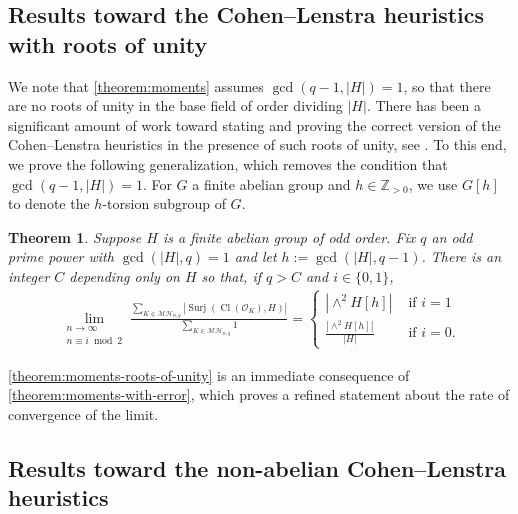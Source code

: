 \documentclass[12 pt]{amsart}
\theoremstyle{plain}
\newtheorem{theorem}[subsubsection]{Theorem}
\theoremstyle{definition}
\theoremstyle{remark}
\numberwithin{equation}{section}
\DeclareMathOperator\cl{Cl}
\DeclareMathOperator\surj{Surj}
\begin{document}
\subsection{Results toward the Cohen--Lenstra heuristics with roots of unity}
We note that \autoref{theorem:moments} assumes $\gcd(q-1,|H|) = 1$, so that
there are no roots of unity in the base field of order dividing $|H|$. 
There has been a significant amount of work toward stating and proving the correct version
of the Cohen--Lenstra heuristics in the presence of such roots of unity, see
\cite{
malle2008cohen,
Malle:distribution,
adamM:a-class-group-heuristic,
garton:random-matrices-the-cohen-lenstra-heuristics-and-roots-of-unity,
lipnowskiST:cohen-lenstra-roots-of-unity,sawinW:conjectures-for-distributions-containing-roots-of-unity}. To this
end, we prove the following generalization, which removes the condition that
$\gcd(q-1,|H|) = 1$.
For $G$ a finite abelian group and $h \in \mathbb Z_{>0}$, we use $G[h]$ to denote
the $h$-torsion subgroup of $G$.

\begin{theorem}
		\label{theorem:moments-roots-of-unity}
	Suppose $H$ is a finite abelian group of odd order. 
	Fix $q$ an odd prime power with 
	$\gcd( |H|, q) = 1$ 
	and let 
	$h := \gcd(|H|, q - 1)$.
	There is an integer $C$ depending only on $H$ so that,
	if $q > C$ and $i \in \{0,1\}$,
	\begin{align}
		\label{equation:moments-with-roots-of-unity}
		\lim_{\substack{n \to \infty \\ n \equiv i \bmod 2 }}
		\frac{\sum_{K \in \mathcal{MH}_{n,q}}
		\left|\surj(\cl(\mathscr O_K), H)\right|} {\sum_{K \in \mathcal{MH}_{n,q}} 1} =
	\begin{cases}
		|\wedge^2 H[h]| & \text{ if } i =1 \\
		\frac{|\wedge^2 H[h]|}{|H|} & \text{ if } i = 0.
	\end{cases}
	\end{align}
\end{theorem}

\autoref{theorem:moments-roots-of-unity} is an immediate consequence of
\autoref{theorem:moments-with-error}, %
which proves a refined statement about the rate of convergence of the limit.

\subsection{Results toward the non-abelian Cohen--Lenstra heuristics}
\end{document}
